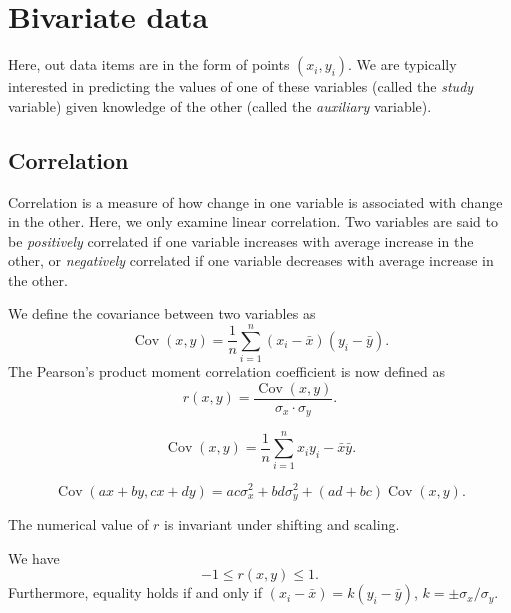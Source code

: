 \documentclass[11pt]{article}
\DeclareMathOperator{\cov}{Cov}
\theoremstyle{definition}
\theoremstyle{remark}
\numberwithin{equation}{section}
\begin{document}
    
    \section{Bivariate data}
    
    Here, out data items are in the form of points $(x_i, y_i)$. We are typically
    interested in predicting the values of one of these variables (called the
    \emph{study} variable) given knowledge of the other (called the \emph{auxiliary}
    variable).


    \subsection{Correlation}
    Correlation is a measure of how change in one variable is associated with change
    in the other. Here, we only examine linear correlation. Two variables are said to
    be \emph{positively} correlated if one variable increases with average increase
    in the other, or \emph{negatively} correlated if one variable decreases with
    average increase in the other.

    We define the covariance between two variables as \[
        \cov(x, y) = \frac{1}{n}\sum_{i = 1}^n (x_i - \bar{x})(y_i - \bar{y}).
    \] The Pearson's product moment correlation coefficient is now defined as \[
        r(x, y) = \frac{\cov(x, y)}{\sigma_x\cdot \sigma_y}.
    \]

    \begin{lemma}
        \[
            \cov(x, y) = \frac{1}{n}\sum_{i = 1}^n x_iy_i - \bar{x}\bar{y}.
        \] 
    \end{lemma}

    \begin{lemma}
        \[
            \cov(ax + by, cx + dy) = ac\sigma_x^2 + bd\sigma_y^2 + (ad + bc)\cov(x,
            y).
        \]
    \end{lemma}

    \begin{lemma}
        The numerical value of $r$ is invariant under shifting and scaling.
    \end{lemma}
    
    \begin{lemma}
        We have \[
            -1 \leq r(x, y) \leq 1.
        \] Furthermore, equality holds if and only if $(x_i - \bar{x}) = k(y_i -
        \bar{y})$, $k = \pm \sigma_x / \sigma_y$.
    \end{lemma}
    
\end{document}
